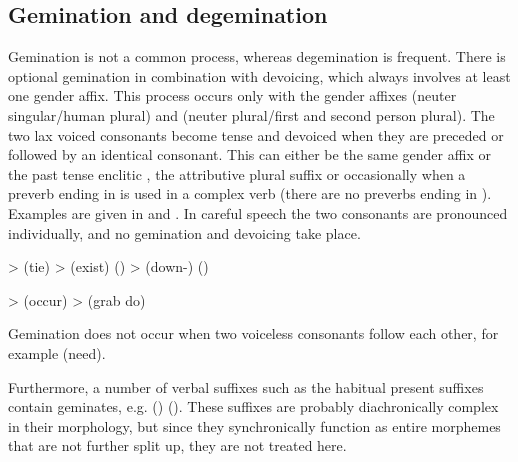 \subsection{Gemination and degemination}
\label{ssec:Gemination and degemination}
Gemination is not a common process, whereas degemination is frequent. There is optional gemination in combination with devoicing, which always involves at least one gender affix. This process occurs only with the gender affixes  (neuter singular\slash human plural) and  (neuter plural\slash first and second person plural). The two lax voiced consonants become tense and devoiced when they are preceded or followed by an identical consonant. This can either be the same gender affix or the past tense enclitic , the attributive plural suffix  or occasionally when a preverb ending in  is used in a complex verb (there are no preverbs ending in ). Examples are given in  and . In careful speech the two consonants are pronounced individually, and no gemination and devoicing take place.
%
\begin{exe}
	\label{ex:d dt t phon}
	\begin{xlist}
		\ex	{} >   (tie)
		\ex	{} >   (exist) ()
		\ex	{} >   (down-) ()
	\end{xlist}

	\label{ex:bp b p phon}
	\begin{xlist}
		\ex	{} >   (occur\tsc{.pfv-pret})
		\ex	{} >   (grab do\tsc{.pfv-pret})
	\end{xlist}
\end{exe}

Gemination does not occur when two voiceless consonants follow each other, for example  (need).

Furthermore, a number of verbal suffixes such as the habitual present suffixes contain geminates, e.g.  () (). These suffixes are probably diachronically complex in their morphology, but since they synchronically function as entire morphemes that are not further split up, they are not treated here.


